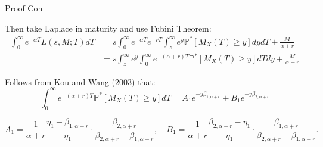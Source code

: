 \documentclass{beamer}
\begin{document}
\begin{frame}{Proof Con}

    {\footnotesize \footnotesize
    \par Then take Laplace in maturity and use Fubini Theorem:
    \begin{align*}
      \int_{0}^{\infty} e^{-\alpha T} L(s, M; T) dT 
    &= s \int_{0}^{\infty} e^{-\alpha T} e^{-rT} \int_{z}^{\infty} e^{y} \mathbb{P}^*[M_X(T) \geq y] dy dT + \frac{M}{\alpha + r} \\
    &= s \int_{z}^{\infty} e^{y} \int_{0}^{\infty} e^{-(\alpha + r)T} \mathbb{P}^*[M_X(T) \geq y] dT dy + \frac{M}{\alpha + r}
    \end{align*}
    
    \par  \pause Follows from Kou and Wang (2003) that:
    \[
    \int_{0}^{\infty} e^{-(\alpha + r)T} \mathbb{P}^*[M_X(T) \geq y] dT = A_1 e^{-y\beta_{1,\alpha+r}} + B_1 e^{-y\beta_{2,\alpha+r}}
    \]

    \[
    A_1 = \frac{1}{\alpha + r} \frac{\eta_1 - \beta_{1,\alpha+r}}{\eta_1} \cdot \frac{\beta_{2,\alpha+r}}{\beta_{2,\alpha+r} - \beta_{1,\alpha+r}}, \quad
    B_1 = \frac{1}{\alpha + r} \frac{\beta_{2,\alpha+r} - \eta_1}{\eta_1} \cdot \frac{\beta_{1,\alpha+r}}{\beta_{2,\alpha+r} - \beta_{1,\alpha+r}}.
    \]
    }
    
\end{frame}
\end{document}
